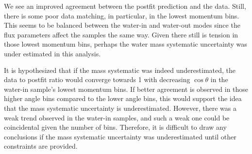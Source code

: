 We see an improved agreement between the postfit prediction and the
data. Still, there is some poor data matching, in particular, in the
lowest momentum bins. This seems to be balanced between the water-in
and water-out modes since the flux parameters affect the samples the
same way. Given there still is tension in those lowest momentum bins,
perhaps the water mass systematic uncertainty was under estimated
in this analysis.

It is hypothesized that if the mass systematic was indeed underestimated,
the data to postfit ratio would converge towards 1 with decreasing
$\cos\theta$ in the water-in sample's lowest momentum bins. If better
agreement is observed in those higher angle bins compared to the lower
angle bins, this would support the idea that the mass systematic uncertainty
is underestimated. However, there was a weak trend observed in the
water-in samples, and such a weak one could be coincidental given
the number of bins. Therefore, it is difficult to draw any conclusions
if the mass systematic uncertainty was underestimated until other
constraints are provided.

